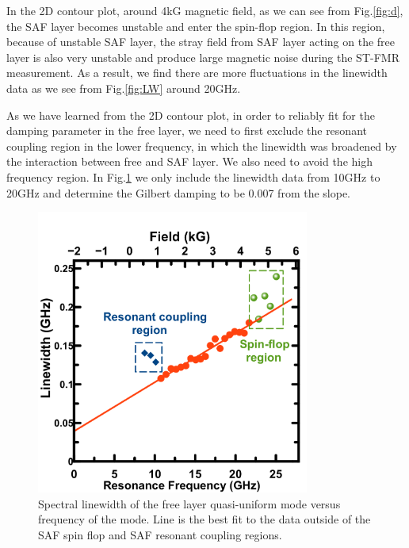 In the 2D contour plot, around 4kG magnetic field, as we can see from Fig.\ref{fig:d}, the SAF layer becomes unstable and enter the spin-flop region. In this region, because of unstable SAF layer, the stray field from SAF layer acting on the free layer is also very unstable and produce large magnetic noise during the ST-FMR measurement. As a result, we find there are more fluctuations in the linewidth data as we see from Fig.\ref{fig:LW} around 20GHz.

As we have learned from the 2D contour plot, in order to reliably fit for the damping parameter in the free layer, we need to first exclude the resonant coupling region in the lower frequency, in which the linewidth was broadened by the interaction between free and SAF layer. We also need to avoid the high frequency region. In Fig.\ref{fig:LW_FIT} we only include the linewidth data from 10GHz to 20GHz and determine the Gilbert damping to be 0.007 from the slope.
 
\begin{figure}[h]
  \centering
  \includegraphics[width=0.8\textwidth]{fig/FieldMod/LW_PLOT.png}
  \caption{Spectral linewidth of the free layer quasi-uniform mode versus frequency of the mode. Line is the best fit to the data outside of the SAF spin flop and SAF resonant coupling regions.}
  \label{fig:LW_FIT}
\end{figure}

